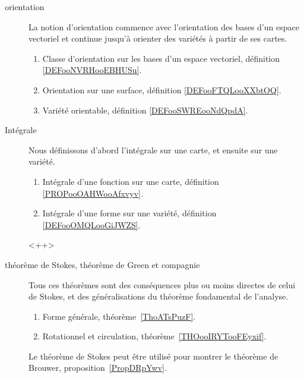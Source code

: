\begin{description}
	\item[orientation]
		La notion d'orientation commence avec l'orientation des bases d'un espace vectoriel et continue jusqu'à orienter des variétés à partir de ses cartes.
		\begin{enumerate}
			\item
			      Classe d'orientation sur les bases d'un espace vectoriel, définition \ref{DEFooNVRHooEBHUSu}.
			\item
			      Orientation sur une surface, définition \ref{DEFooFTQLooXXbtOQ}.
			\item
			      Variété orientable, définition \ref{DEFooSWREooNdQpdA}.
		\end{enumerate}
	\item[Intégrale]
		Nous définissons d'abord l'intégrale sur une carte, et ensuite sur une variété.
		\begin{enumerate}
			\item
			      Intégrale d'une fonction sur une carte, définition \ref{PROPooOAHWooAfxvyv}.
			\item
			      Intégrale d'une forme sur une variété, définition \ref{DEFooOMQLooGiJWZS}.
		\end{enumerate}<++>
	\item[théorème de Stokes, théorème de Green et compagnie]
		Tous ces théorèmes sont des conséquences plus ou moins directes de celui de Stokes, et des généralisations du théorème fondamental de l'analyse.
		\begin{enumerate}
			\item
			      Forme générale, théorème~\ref{ThoATsPuzF}.
			\item
			      Rotationnel et circulation, théorème~\ref{THOooIRYTooFEyxif}.
		\end{enumerate}
		Le théorème de Stokes peut être utilisé pour montrer le théorème de Brouwer, proposition~\ref{PropDRpYwv}.
\end{description}
